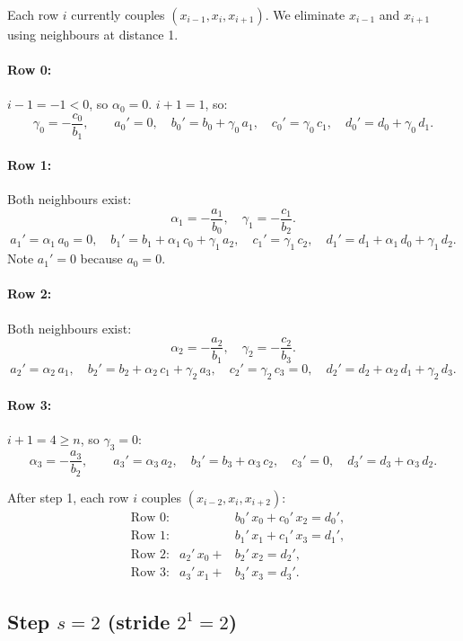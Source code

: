 \documentclass[11pt]{article}
\begin{document}
Each row $i$ currently couples $(x_{i-1}, x_i, x_{i+1})$.
We eliminate $x_{i-1}$ and $x_{i+1}$ using neighbours at distance 1.

\paragraph{Row 0:} $i - 1 = -1 < 0$, so $\alpha_0 = 0$. $i + 1 = 1$, so:
\[
\gamma_0 = -\frac{c_0}{b_1}, \qquad
a_0' = 0, \quad
b_0' = b_0 + \gamma_0 \, a_1, \quad
c_0' = \gamma_0 \, c_1, \quad
d_0' = d_0 + \gamma_0 \, d_1.
\]

\paragraph{Row 1:} Both neighbours exist:
\[
\alpha_1 = -\frac{a_1}{b_0}, \quad \gamma_1 = -\frac{c_1}{b_2}.
\]
\[
a_1' = \alpha_1 \, a_0 = 0, \quad
b_1' = b_1 + \alpha_1 \, c_0 + \gamma_1 \, a_2, \quad
c_1' = \gamma_1 \, c_2, \quad
d_1' = d_1 + \alpha_1 \, d_0 + \gamma_1 \, d_2.
\]
Note $a_1' = 0$ because $a_0 = 0$.

\paragraph{Row 2:} Both neighbours exist:
\[
\alpha_2 = -\frac{a_2}{b_1}, \quad \gamma_2 = -\frac{c_2}{b_3}.
\]
\[
a_2' = \alpha_2 \, a_1, \quad
b_2' = b_2 + \alpha_2 \, c_1 + \gamma_2 \, a_3, \quad
c_2' = \gamma_2 \, c_3 = 0, \quad
d_2' = d_2 + \alpha_2 \, d_1 + \gamma_2 \, d_3.
\]

\paragraph{Row 3:} $i + 1 = 4 \geq n$, so $\gamma_3 = 0$:
\[
\alpha_3 = -\frac{a_3}{b_2}, \qquad
a_3' = \alpha_3 \, a_2, \quad
b_3' = b_3 + \alpha_3 \, c_2, \quad
c_3' = 0, \quad
d_3' = d_3 + \alpha_3 \, d_2.
\]

After step 1, each row $i$ couples $(x_{i-2}, x_i, x_{i+2})$:
\[
\begin{aligned}
&\text{Row 0:} & &b_0' \, x_0 + c_0' \, x_2 = d_0', \\
&\text{Row 1:} & &b_1' \, x_1 + c_1' \, x_3 = d_1', \\
&\text{Row 2:} & a_2' \, x_0 + &b_2' \, x_2 = d_2', \\
&\text{Row 3:} & a_3' \, x_1 + &b_3' \, x_3 = d_3'.
\end{aligned}
\]

\subsection{Step $s = 2$ (stride $2^1 = 2$)}
\end{document}
